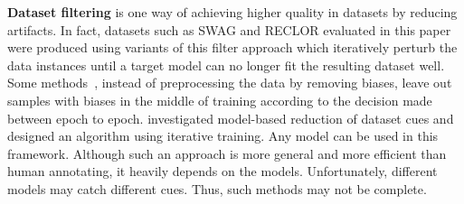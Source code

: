 \textbf{Dataset filtering} is one way of achieving
higher quality in datasets by reducing artifacts. 
In fact, datasets such as SWAG and RECLOR evaluated in this paper
were produced using variants of this filter approach which 
iteratively perturb the data instances until a target 
model can no longer fit the resulting dataset well. 
Some methods~\cite{yaghoobzadeh2019robust}, instead of preprocessing
the data by removing biases, leave out samples with biases 
in the middle of training according to the decision made between 
epoch to epoch. \cite{bras2020adversarial} investigated 
model-based reduction of dataset cues and designed an algorithm 
using iterative training. Any model can be used in 
this framework. Although such an approach is more 
general and more efficient than human annotating, 
it heavily depends on the models. Unfortunately, different models
may catch different cues. Thus, such methods may not be complete.






